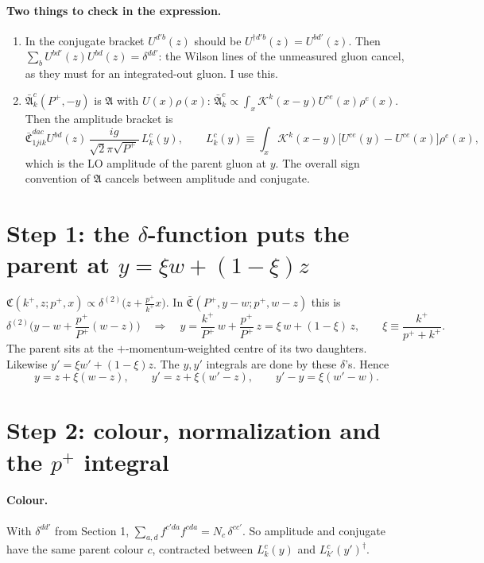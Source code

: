 \documentclass[10pt]{article}
\numberwithin{equation}{section}
\newcommand{\mf}[1]{\mathfrak{#1}}
\begin{document}
\paragraph{Two things to check in the expression.}
\begin{enumerate}
\item In the conjugate bracket $U^{d'b}(z)$ should be $U^{\dagger d'b}(z)=U^{bd'}(z)$. Then $\sum_bU^{bd'}(z)U^{bd}(z)=\delta^{dd'}$: the Wilson lines of the unmeasured gluon cancel, as they must for an integrated-out gluon. I use this.
\item $\bar{\mf A}^{c}_k(P^+,-y)$ is $\mf A$ with $U(x)\rho(x)$: $\bar{\mf A}^{c}_k\propto\int_x\mathcal K^k(x-y)U^{ce}(x)\rho^e(x)$. Then the amplitude bracket is
\begin{equation}
\bar{\mf C}^{dac}_{1jik}U^{bd}(z)\,\frac{ig}{\sqrt2\pi\sqrt{P^+}}\,L^{c}_k(y),\qquad
L^{c}_k(y)\equiv\int_x\mathcal K^k(x-y)\big[U^{ce}(y)-U^{ce}(x)\big]\rho^e(x),
\end{equation}
which is the LO amplitude of the parent gluon at $y$. The overall sign convention of $\mf A$ cancels between amplitude and conjugate.
\end{enumerate}

\section{Step 1: the $\delta$-function puts the parent at $y=\xi w+(1-\xi)z$}
$\mf C(k^+,z;p^+,x)\propto\delta^{(2)}\big(z+\frac{p^+}{k^+}x\big)$. In $\bar{\mf C}(P^+,y-w;p^+,w-z)$ this is
\begin{equation}
\delta^{(2)}\Big(y-w+\frac{p^+}{P^+}(w-z)\Big)\quad\Rightarrow\quad y=\frac{k^+}{P^+}\,w+\frac{p^+}{P^+}\,z=\xi\,w+(1-\xi)\,z,\qquad \xi\equiv\frac{k^+}{p^++k^+}.
\end{equation}
The parent sits at the $+$-momentum-weighted centre of its two daughters. Likewise $y'=\xi w'+(1-\xi)z$. The $y,y'$ integrals are done by these $\delta$'s. Hence
\begin{equation}
y=z+\xi(w-z),\qquad y'=z+\xi(w'-z),\qquad y'-y=\xi(w'-w).\label{eq:y}
\end{equation}

\section{Step 2: colour, normalization and the $p^+$ integral}
\paragraph{Colour.} With $\delta^{dd'}$ from Section 1, $\sum_{a,d}f^{c'da}f^{cda}=N_c\,\delta^{cc'}$. So amplitude and conjugate have the same parent colour $c$, contracted between $L^c_k(y)$ and $L^{c}_{k'}(y')^\dagger$.
\end{document}
